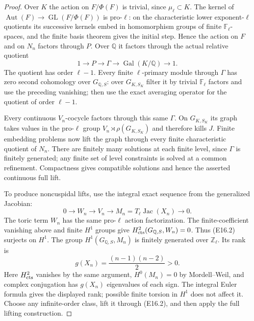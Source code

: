 \documentclass[11pt,oneside]{article}
\begin{document}
\begin{proof}
Over $K$ the action on $F/\Phi(F)$ is trivial,
since $\mu_\ell\subset K$. The kernel of
$\operatorname{Aut}(F)\to\operatorname{GL}(F/\Phi(F))$
is pro-$\ell$: on the characteristic lower
exponent-$\ell$ quotients its successive kernels
embed in homomorphism groups of finite
$\mathbb F_\ell$-spaces, and the finite basis
theorem gives the initial step. Hence the
action on $F$ and on $N_n$ factors through $P$.
Over $\mathbb Q$ it factors through the actual
relative quotient
\[
 1\longrightarrow P\longrightarrow\Gamma
 \longrightarrow\operatorname{Gal}(K/\mathbb Q)
 \longrightarrow1 .
\]
The quotient has order $\ell-1$. Every finite
$\ell$-primary module through $\Gamma$ has zero
second cohomology over $G_{\mathbb Q,S}$:
over $G_{K,S_K}$ filter it by trivial
$\mathbb F_\ell$ factors and use the preceding
vanishing; then use the exact averaging
operator for the quotient of order $\ell-1$.

Every continuous $V_n$-cocycle factors through
this same $\Gamma$. On $G_{K,S_K}$ its graph
takes values in the pro-$\ell$ group
$V_n\rtimes\rho(G_{K,S_K})$ and therefore kills
$J$. Finite embedding problems now lift the
graph through every finite characteristic
quotient of $N_n$. There are finitely many
solutions at each finite level, since
$\Gamma$ is finitely generated; any finite
set of level constraints is solved at a
common refinement. Compactness gives
compatible solutions and hence the asserted
continuous full lift.

To produce noncuspidal lifts, use the integral
exact sequence from the generalized Jacobian:
\[
 0\longrightarrow W_n\longrightarrow V_n
 \longrightarrow M_n=T_\ell\operatorname{Jac}(X_n)
 \longrightarrow0 .
 \tag{E16.2}
\]
The toric term $W_n$ has the same pro-$\ell$
action factorization. The finite-coefficient
vanishing above and finite $H^1$ groups give
$H^2_{\rm cts}(G_{\mathbb Q,S},W_n)=0$.
Thus (E16.2) surjects on $H^1$.
The group $H^1(G_{\mathbb Q,S},M_n)$ is finitely
generated over $\mathbb Z_\ell$. Its rank is
\[
 g(X_n)=\frac{(n-1)(n-2)}2>0 .
\]
Here $H^2_{\rm cts}$ vanishes by the same argument,
$H^0(M_n)=0$ by Mordell--Weil, and complex
conjugation has $g(X_n)$ eigenvalues of each
sign. The integral Euler formula gives the
displayed rank; possible finite torsion in
$H^1$ does not affect it. Choose any infinite-order
class, lift it through (E16.2), and then apply
the full lifting construction.


\end{proof}
\end{document}
